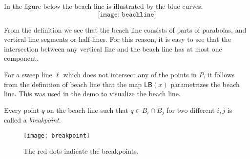 In the figure below the beach line is illustrated by the blue curves:
\[
    \texttt{[image: beachline]}
\]
\begin{rmk}
From the definition we see that the beach line consists of parts of parabolas, and vertical line segments or half-lines. For this reason, it is easy to see that the intersection between any vertical line and the beach line has at most one component.
\end{rmk}
\begin{rmk}
For a sweep line $\ell$ which does not intersect any of the points in $P$, it follows from the definition of beach line that the map $\textsf{LB}(x)$ parametrizes the beach line. This was used in the demo to visualize the beach line.
\end{rmk}
\begin{defn}[Breakpoint]
Every point $q$ on the beach line such that $q \in B_i \cap B_j$ for two different $i, j$ is called a \textit{breakpoint}.
\end{defn}

\begin{figure}[H]
    \centering
    \texttt{[image: breakpoint]} %
    \caption{The red dots indicate the breakpoints.}
    \label{fig:example-of-breakpoint}
\end{figure}

